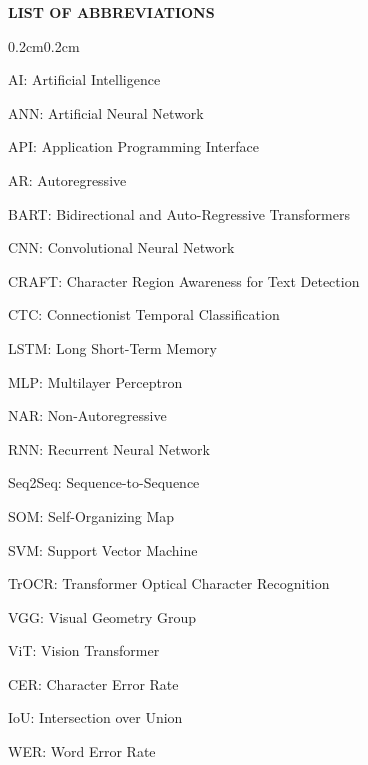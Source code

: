 \begin{center}
    {\englishfont\fontsize{14pt}{21pt}\selectfont \textbf{LIST OF ABBREVIATIONS} \par}
\end{center}
\label{loa}

\begin{adjustwidth}{0.2cm}{0.2cm}

    \vspace{-0.2cm}
    \setlength{\parindent}{0pt}
    \vspace{0.3cm}
    
    {\large AI: Artificial Intelligence\dotfill\par}
    {\large ANN: Artificial Neural Network\dotfill\par}
    {\large API: Application Programming Interface\dotfill\par}
    {\large AR: Autoregressive\dotfill\par}
    
    {\large BART: Bidirectional and Auto-Regressive Transformers\dotfill\par}
    {\large CNN: Convolutional Neural Network\dotfill\par}
    {\large CRAFT: Character Region Awareness for Text Detection\dotfill\par}
    {\large CTC: Connectionist Temporal Classification\dotfill\par}
    {\large LSTM: Long Short-Term Memory\dotfill\par}
    {\large MLP: Multilayer Perceptron\dotfill\par}
    {\large NAR: Non-Autoregressive\dotfill\par}
    {\large RNN: Recurrent Neural Network\dotfill\par}
    {\large Seq2Seq: Sequence-to-Sequence\dotfill\par}
    {\large SOM: Self-Organizing Map\dotfill\par}
    {\large SVM: Support Vector Machine\dotfill\par}
    {\large TrOCR: Transformer Optical Character Recognition\dotfill\par}
    {\large VGG: Visual Geometry Group\dotfill\par}
    {\large ViT: Vision Transformer\dotfill\par}
    
    {\large CER: Character Error Rate\dotfill\par}
    {\large IoU: Intersection over Union\dotfill\par}
    {\large WER: Word Error Rate\dotfill\par}
    

\end{adjustwidth}
